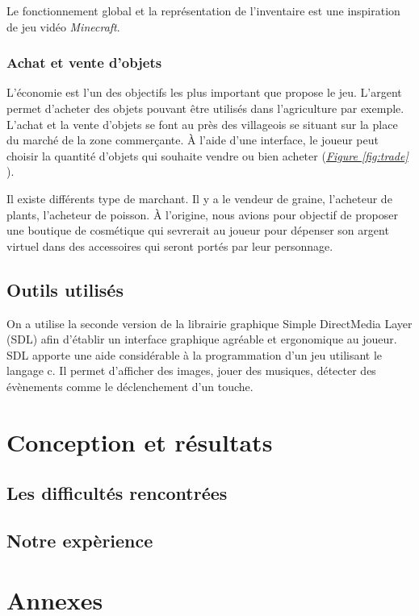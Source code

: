 \documentclass{article}
\begin{document}
        Le fonctionnement global et la représentation de l'inventaire est une inspiration de jeu vidéo \textit{Minecraft}.
        
        \subsubsection{Achat et vente d'objets}
        L'économie est l'un des objectifs les plus important que propose le jeu. L'argent permet d'acheter des objets pouvant être utilisés dans l'agriculture par exemple. L'achat et la vente d'objets se font au près des villageois se situant sur la place du marché de la zone commerçante. À l'aide d'une interface, le joueur peut choisir la quantité d'objets qui souhaite vendre ou bien acheter (\textit{\hyperref[fig:trade]{Figure \ref{fig:trade}}} ).
        
        Il existe différents type de marchant. Il y a le vendeur de graine, l'acheteur de plants, l'acheteur de poisson. À l'origine, nous avions pour objectif de proposer une boutique de cosmétique qui sevrerait au joueur pour dépenser son argent virtuel dans des accessoires qui seront portés par leur personnage.
    
    \subsection{Outils utilisés}
    On a utilise la seconde version de la librairie graphique Simple DirectMedia Layer (SDL) afin d’établir un interface graphique agréable et ergonomique au joueur. SDL apporte une aide considérable à la programmation d’un jeu utilisant le langage c. Il permet d’afficher des images, jouer des musiques, détecter des évènements comme le déclenchement d’un touche. 
\section{Conception et résultats}
    \subsection{Les difficultés rencontrées}
    \subsection{Notre expèrience}
\section{Annexes}
\end{document}
